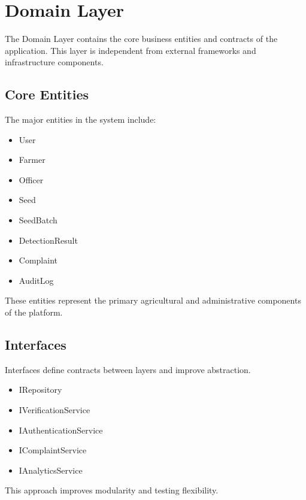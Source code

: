 \section{Domain Layer}
\label{sec:domain-layer}

The Domain Layer contains the core business entities and contracts of the application. This layer is independent from external frameworks and infrastructure components.

\subsection{Core Entities}

The major entities in the system include:

\begin{itemize}
    \item User
    \item Farmer
    \item Officer
    \item Seed
    \item SeedBatch
    \item DetectionResult
    \item Complaint
    \item AuditLog
\end{itemize}

These entities represent the primary agricultural and administrative components of the platform.

\subsection{Interfaces}

Interfaces define contracts between layers and improve abstraction.

\begin{itemize}
    \item IRepository
    \item IVerificationService
    \item IAuthenticationService
    \item IComplaintService
    \item IAnalyticsService
\end{itemize}

This approach improves modularity and testing flexibility.

